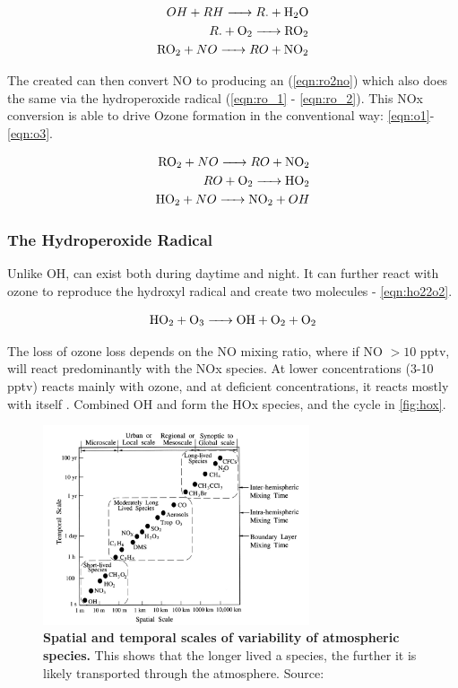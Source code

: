 \begin{align}
  OH + RH \ce{ -> } R. + \ch{h2o} \\
  R. + \ch{o2} \ce{ -> } \ch{RO2} \label{eqn:rdo2}\\
  \ch{ro2} + NO \ce{ -> } RO + \ch{no2}
\end{align}


The created  can then convert NO to  producing an  (\autoref{eqn:ro2no}) which also does the same via the hydroperoxide radical  (\autoref{eqn:ro_1} - \ref{eqn:ro_2}). This NOx conversion is able to drive Ozone formation in the conventional way: \autoref{eqn:o1}-\ref{eqn:o3}.


  \begin{align}
    \ch{ro2} + NO \ce{ -> } RO + \ch{no2} \label{eqn:ro2no} \\
    RO + \ce{O2}  \ce{ -> } \ch{HO2} \label{eqn:ro_1} \\
    \ce{HO2} + NO \ce{ -> } \ch{NO2} + OH \label{eqn:ro_2}
\end{align}


\subsubsection{The Hydroperoxide Radical}

Unlike OH,  can exist both during daytime and night. It can further react with ozone to reproduce the hydroxyl radical and create two  molecules - \autoref{eqn:ho22o2}.

\begin{equation}
  \ce{HO2 + O3 -> OH + O2 + O2} \label{eqn:ho22o2}
\end{equation}

The loss of ozone loss depends on the NO mixing ratio, where if NO $>10$ pptv,  will react predominantly with the NOx species. At lower concentrations (3-10 pptv)  reacts mainly with ozone, and at deficient concentrations, it reacts mostly with itself \citep{finlayson}. Combined OH and  form the HOx species, and the cycle in \autoref{fig:hox}.

\begin{figure}[H]
  \centering
  \includegraphics[width=0.7\textwidth]{timescales.png}
  \caption{\textbf{Spatial and temporal scales of variability of atmospheric species.} This shows that the longer lived a species, the further it is likely transported through the atmosphere. Source: \citep{transporttime}}
  \label{fig:timescales}
\end{figure}

